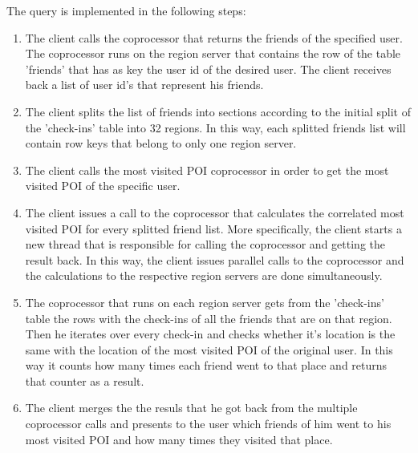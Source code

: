 The query is implemented in the following steps:

\begin{enumerate}
 \item The client calls the coprocessor that returns the friends of the specified user. The coprocessor runs on the region server that contains 
 the row of the table 'friends' that has as key the user id of the desired user. The client receives back a list of user id's that 
 represent his friends.
 \item The client splits the list of friends into sections according to the initial split of the 'check-ins' table into 32 regions. In this way, 
 each splitted friends list will contain row keys that belong to only one region server.
 \item The client calls the most visited POI coprocessor in order to get the most visited POI of the specific user.
 \item The client issues a call to the coprocessor that calculates the correlated most visited POI for every splitted friend list. 
 More specifically, the client starts a new thread that is responsible for calling the coprocessor and getting the result back. 
 In this way, the client issues parallel calls to the coprocessor and the calculations to the respective region servers are done simultaneously.
 \item The coprocessor that runs on each region server gets from the 'check-ins' table the rows with the check-ins of all the friends that are 
 on that region. Then he iterates over every check-in and checks whether it's location is the same with the location of the most visited POI 
 of the original user. In this way it counts how many times each friend went to that place and returns that counter as a result.
 \item The client merges the the resuls that he got back from the multiple coprocessor calls and presents to the user which friends of him went 
 to his most visited POI and how many times they visited that place.

 \end{enumerate}







